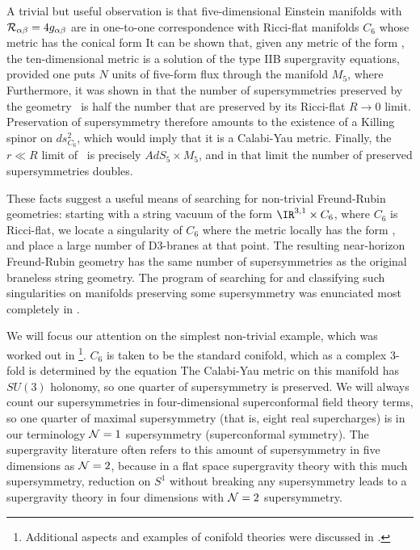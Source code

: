 A trivial but useful observation is that five-dimensional Einstein
manifolds with ${\cal R}_{\alpha\beta} = 
4 g_{\alpha\beta}$ are in one-to-one
correspondence with Ricci-flat manifolds $C_6$ whose metric has the
conical form
 It can be shown that, given any metric of the form \ConeForm, the
ten-dimensional metric
 is a solution of the type IIB supergravity equations, provided one
puts $N$ units of five-form flux through the manifold $M_5$, where
 Furthermore, it was shown in \cite{Kehagias:1998gn} that the number of
supersymmetries preserved by the geometry \KehagMetric\ is half the number
that are preserved by its Ricci-flat $R \to 0$ limit.  Preservation of
supersymmetry therefore amounts to the existence of a Killing spinor on
$ds_{C_6}^2$, which would imply that it is a Calabi-Yau metric.  Finally,
the $r \ll R$ limit of \KehagMetric\ is precisely $AdS_5 \times M_5$, and
in that limit the number of preserved supersymmetries doubles.

These facts suggest a useful means of searching for non-trivial
Freund-Rubin geometries: starting with a string vacuum of the form
$\IR^{3,1} \times C_6$, where $C_6$ is Ricci-flat, we locate
a singularity of $C_6$ where the metric locally has the form
\ConeForm, and place a large number of D3-branes at that point.  The
resulting near-horizon Freund-Rubin geometry has the same number of
supersymmetries as the original braneless string geometry.  The
program of searching for and classifying such singularities on
manifolds preserving some supersymmetry was enunciated most completely
in \cite{Morrison:1998cs}.

We will focus our attention on the simplest non-trivial example, which was
worked out in \cite{Klebanov:1998hh}\footnote{Additional aspects and
examples of
conifold theories were discussed in \cite{Uranga:1999vf,Dasgupta:1998su,
Gubser:1999ia,Lopez:1999zf,
vonUnge:1999hc,Erlich:1999rb}.}. 
$C_6$ is taken to be the standard conifold, which
as a complex 3-fold is determined by the equation
 The Calabi-Yau metric on this manifold has $SU(3)$ holonomy, so one
quarter of supersymmetry is preserved.  We will always count our
supersymmetries in four-dimensional superconformal field theory terms,
so one quarter of maximal supersymmetry (that is, eight real
supercharges) is in our terminology ${\cal N}=1$ supersymmetry
(superconformal symmetry).  The
supergravity literature often refers to this amount of supersymmetry
in five dimensions as ${\cal N}=2$, because in a flat space
supergravity theory with this much supersymmetry, reduction on $S^1$
without breaking any supersymmetry leads to a supergravity theory in
four dimensions with ${\cal N}=2$ supersymmetry.

